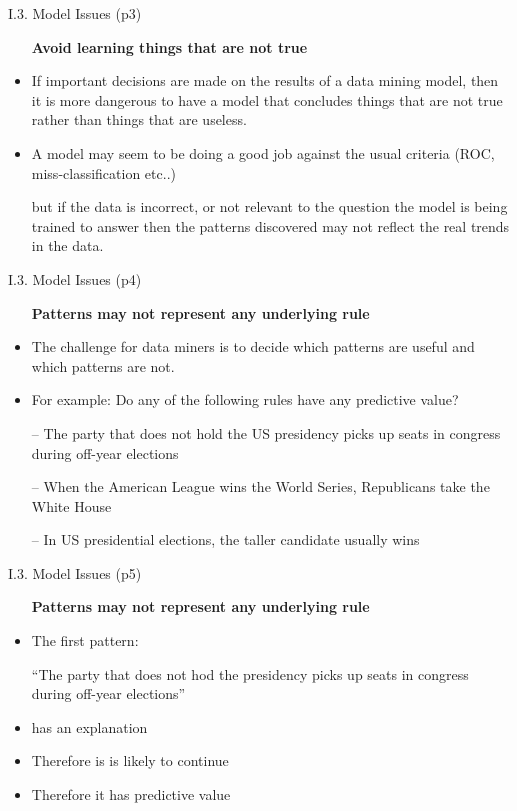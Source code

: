 \documentclass[handout]{beamer}
\newcommand{\strong}[1]{\textbf{\color{teal} #1}}
\begin{document}
\begin{frame}{I.3. Model Issues (p3)}
\begin{itemize}
\item[] \strong{Avoid learning things that are not true}
\item[]
\item If important decisions are made on the results of a data mining model, then it is more dangerous to have a model that concludes things that are not true rather than things that are useless.
\item A model may seem to be doing a good job against the usual criteria (ROC, miss-classification etc..)
\item[] but if the data is incorrect, or not relevant to the question the model is being trained to answer then the patterns discovered may not reflect the real trends in the data.
\end{itemize}
\end{frame}
\begin{frame}{I.3. Model Issues (p4)}
\begin{itemize}
\item[] \strong{Patterns may not represent any underlying rule}
\item[]
\item The challenge for data miners is to decide which patterns are useful and which patterns are not.
\item For example: Do any of the following rules have any predictive value?
\item[--] The party that does not hold the US presidency picks up seats in congress during off-year elections
\item[--] When the American League wins the World Series, Republicans take the White House
\item[--] In US presidential elections, the taller candidate usually wins
\end{itemize}
\end{frame}
\begin{frame}{I.3. Model Issues (p5)}
\begin{itemize}
\item[] \strong{Patterns may not represent any underlying rule}
\item[]
\item The first pattern:
\item[] ``The party that does not hod the presidency picks up seats in congress during off-year elections'' 
\item has an explanation 
\item Therefore is is likely to continue
\item Therefore it has predictive value
\end{itemize}
\end{frame}
\end{document}
